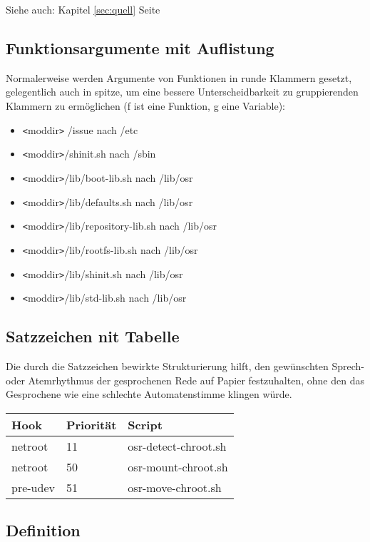 \documentclass[10pt,a4paper]{article}
\begin{document}
Siehe auch: Kapitel \ref{sec:quell} Seite \pageref{sec:quell}

\subsection{Funktionsargumente mit Auflistung}

Normalerweise werden Argumente von Funktionen in runde Klammern gesetzt,
gelegentlich auch in spitze, um eine bessere Unterscheidbarkeit zu
gruppierenden Klammern zu ermöglichen (f ist eine Funktion, g eine Variable):

\begin{itemize}
 \item \verb|<|moddir\verb|>| /issue nach /etc
 \item \verb|<|moddir\verb|>|/shinit.sh nach /sbin
 \item \verb|<|moddir\verb|>|/lib/boot-lib.sh nach /lib/osr
 \item \verb|<|moddir\verb|>|/lib/defaults.sh nach /lib/osr
 \item \verb|<|moddir\verb|>|/lib/repository-lib.sh nach /lib/osr
 \item \verb|<|moddir\verb|>|/lib/rootfs-lib.sh nach /lib/osr
 \item \verb|<|moddir\verb|>|/lib/shinit.sh nach /lib/osr
 \item \verb|<|moddir\verb|>|/lib/std-lib.sh nach /lib/osr
\end{itemize}

\subsection{Satzzeichen nit Tabelle}

Die durch die Satzzeichen bewirkte Strukturierung hilft, den gewünschten
Sprech- oder Atemrhythmus der gesprochenen Rede auf Papier festzuhalten,
ohne den das Gesprochene wie eine schlechte Automatenstimme klingen würde.

\begin{tabular}{|l|l|l|}
 \hline
\textbf{Hook} & \textbf{Priorität} & \textbf{Script} \\ \hline
netroot  & 11 & osr-detect-chroot.sh \\ \hline
netroot  & 50 & osr-mount-chroot.sh \\ \hline
pre-udev & 51 & osr-move-chroot.sh \\ \hline
\end{tabular}

\subsection * {Definition}
\end{document}
